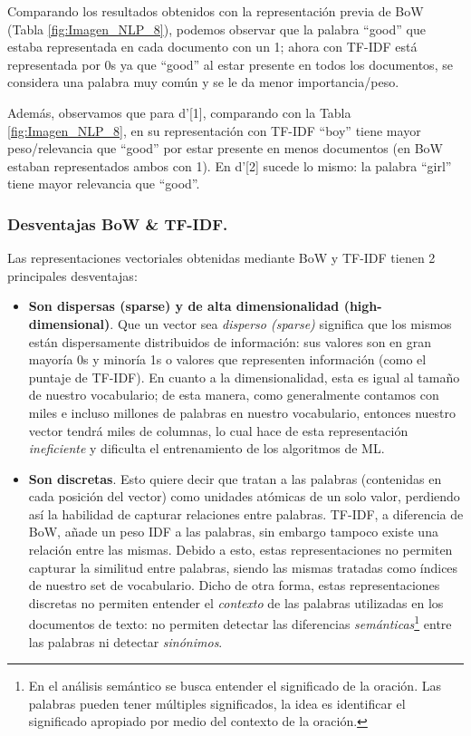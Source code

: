 \documentclass[12pt,a4paper]{article}
\begin{document}
\begin{sloppypar}
Comparando los resultados obtenidos con la representación previa de BoW (Tabla \ref{fig:Imagen_NLP_8}), podemos observar que la palabra “good” que estaba representada en cada documento con un 1; ahora con TF-IDF está representada por 0s ya que “good” al estar presente en todos los documentos, se considera una palabra muy común y se le da menor importancia/peso.

Además, observamos que para d’[1], comparando con la Tabla \ref{fig:Imagen_NLP_8}, en su representación con TF-IDF “boy” tiene mayor peso/relevancia que “good” por estar presente en menos documentos (en BoW estaban representados ambos con 1). En d’[2] sucede lo mismo: la palabra “girl” tiene mayor relevancia que “good”.

\subsubsection{Desventajas BoW \& TF-IDF.}\label{desv_bow_tfidf}

Las representaciones vectoriales obtenidas mediante BoW y TF-IDF tienen 2 principales desventajas\cite{NLP_26, NLP_2}: 
\begin{itemize}
\item \textbf{Son dispersas (sparse) y de alta dimensionalidad (high-dimensional)}. Que un vector sea \textit{disperso (sparse)} significa que los mismos están dispersamente distribuidos de información: sus valores son en gran mayoría 0s y minoría 1s o valores que representen información (como el puntaje de TF-IDF). En cuanto a la dimensionalidad, esta es igual al tamaño de nuestro vocabulario; de esta manera, como generalmente contamos con miles e incluso millones de palabras en nuestro vocabulario, entonces nuestro vector tendrá miles de columnas, lo cual hace de esta representación \textit{ineficiente} y dificulta el entrenamiento de los algoritmos de ML. 
\item \textbf{Son discretas}. Esto quiere decir que tratan a las palabras (contenidas en cada posición del vector) como unidades atómicas de un solo valor, perdiendo así la habilidad de capturar relaciones entre palabras. TF-IDF, a diferencia de BoW, añade un peso IDF a las palabras, sin embargo tampoco existe una relación entre las mismas. Debido a esto, estas representaciones no permiten capturar la similitud entre palabras, siendo las mismas tratadas como índices de nuestro set de vocabulario. Dicho de otra forma, estas representaciones discretas no permiten entender el \textit{contexto} de las palabras utilizadas en los documentos de texto: no permiten detectar las diferencias \textit{semánticas}\footnote{En el análisis semántico se busca entender el significado de la oración. Las palabras pueden tener múltiples significados, la idea es identificar el significado apropiado por medio del contexto de la oración.} entre las palabras ni detectar \textit{sinónimos}. 
\end{itemize}


\end{sloppypar}
\end{document}

